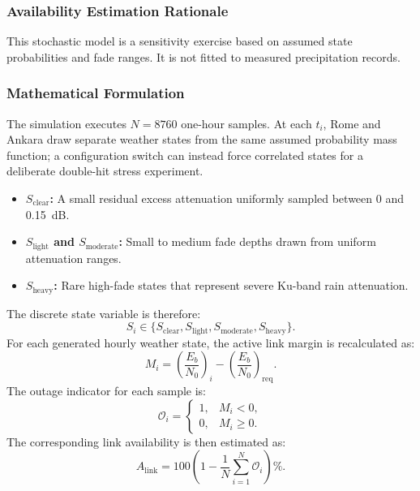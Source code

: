 \subsubsection{Availability Estimation Rationale}
This stochastic model is a sensitivity exercise based on assumed state probabilities and fade ranges. It is not fitted to measured precipitation records.

\subsubsection{Mathematical Formulation}
The simulation executes $N=8760$ one-hour samples. At each $t_i$, Rome and Ankara draw separate weather states from the same assumed probability mass function; a configuration switch can instead force correlated states for a deliberate double-hit stress experiment.
\begin{itemize}
    \item \textbf{$S_{\mathrm{clear}}$:} A small residual excess attenuation uniformly sampled between 0 and 0.15~dB.
    \item \textbf{$S_{\mathrm{light}}$ and $S_{\mathrm{moderate}}$:} Small to medium fade depths drawn from uniform attenuation ranges.
    \item \textbf{$S_{\mathrm{heavy}}$:} Rare high-fade states that represent severe Ku-band rain attenuation.
\end{itemize}
The discrete state variable is therefore:
\begin{equation}
    S_i \in \{S_{\mathrm{clear}}, S_{\mathrm{light}}, S_{\mathrm{moderate}}, S_{\mathrm{heavy}}\}.
\end{equation}
For each generated hourly weather state, the active link margin is recalculated as:
\begin{equation}
    M_i =
    \left(\frac{E_b}{N_0}\right)_i
    -
    \left(\frac{E_b}{N_0}\right)_{\mathrm{req}}.
\end{equation}
The outage indicator for each sample is:
\begin{equation}
    \mathcal{O}_i =
    \begin{cases}
    1, & M_i < 0, \\
    0, & M_i \ge 0.
    \end{cases}
\end{equation}
The corresponding link availability is then estimated as:
\begin{equation}
    A_{\mathrm{link}} =
    100
    \left(
    1 -
    \frac{1}{N}
    \sum_{i=1}^{N}
    \mathcal{O}_i
    \right)\%.
\end{equation}

